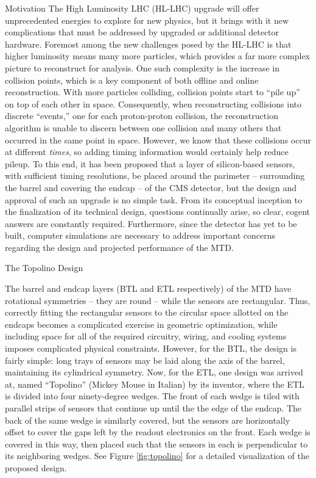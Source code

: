 \documentclass[oneside,12pt,final]{sty/ucthesis-CA2012}
\begin{document}
\begin{mainmatter}
\begin{section}{Motivation}
The High Luminosity LHC (HL-LHC) upgrade will offer unprecedented energies to explore for new physics, but it brings with it new complications that must be addressed by upgraded or additional detector hardware. Foremost among the new challenges posed by the HL-LHC is that higher luminosity means many more particles, which provides a far more complex picture to reconstruct for analysis. One such complexity is the increase in collision points, which is a key component of both offline and online reconstruction. With more particles colliding, collision points start to ``pile up'' on top of each other in space. Consequently, when reconstructing collisions into discrete ``events,'' one for each proton-proton collision, the reconstruction algorithm is unable to discern between one collision and many others that occurred in the same point in space. However, we know that these collisions occur at different \textit{times}, so adding timing information would certainly help reduce pileup. To this end, it has been proposed that a layer of silicon-based sensors, with sufficient timing resolutions, be placed around the parimeter -- surrounding the barrel and covering the endcap -- of the CMS detector, but the design and approval of such an upgrade is no simple task. From its conceptual inception to the finalization of its technical design, questions continually arise, so clear, cogent answers are constantly required. Furthermore, since the detector has yet to be built, computer simulations are necessary to address important concerns regarding the design and projected performance of the MTD.

\end{section}

\begin{section}{The Topolino Design}

The barrel and endcap layers (BTL and ETL respectively) of the MTD have rotational symmetries -- they are round -- while the sensors are rectangular. Thus, correctly fitting the rectangular sensors to the circular space allotted on the endcaps becomes a complicated exercise in geometric optimization, while including space for all of the required circuitry, wiring, and cooling systems imposes complicated physical constraints. However, for the BTL, the design is fairly simple: long trays of sensors may be laid along the axis of the barrel, maintaining its cylindrical symmetry. Now, for the ETL, one design was arrived at, named ``Topolino'' (Mickey Mouse in Italian) by its inventor, where the ETL is divided into four ninety-degree wedges. The front of each wedge is tiled with parallel strips of sensors that continue up until the the edge of the endcap. The back of the same wedge is similarly covered, but the sensors are horizontally offset to cover the gaps left by the readout electronics on the front. Each wedge is covered in this way, then placed such that the sensors in each is perpendicular to its neighboring wedges. See Figure \ref{fig:topolino} for a detailed visualization of the proposed design.


\end{section}
\end{mainmatter}
\end{document}
